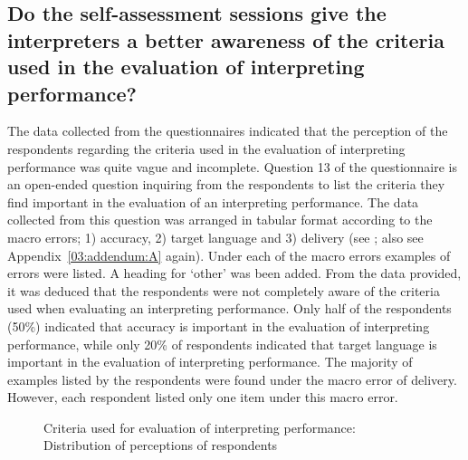 \documentclass[output=paper]{langsci/langscibook}
\begin{document}
\subsection{Do the self-assessment sessions give the interpreters a better awareness of the criteria used in the evaluation of interpreting performance?}
\largerpage
The data collected from the questionnaires indicated that the perception of the respondents regarding the criteria used in the evaluation of interpreting performance was quite vague and incomplete. Question 13 of the questionnaire is an open-ended question inquiring from the respondents to list the criteria they find important in the evaluation of an interpreting performance. The data collected from this question was arranged in tabular format according to the macro errors; 1) accuracy, 2) target language and 3) delivery (see ; also see Appendix~\ref{03:addendum:A} again). Under each of the macro errors examples of errors were listed. A heading for ‘other’ was been added. From the data provided, it was deduced that the respondents were not completely aware of the criteria used when evaluating an interpreting performance. Only half of the respondents (50\%) indicated that accuracy is important in the evaluation of interpreting performance, while only 20\% of respondents indicated that target language is important in the evaluation of interpreting performance. The majority of examples listed by the respondents were found under the macro error of delivery. However, each respondent listed only one item under this macro error. 

\begin{figure}
\caption{\label{fig:deysel:2}Criteria used for evaluation of interpreting performance: Distribution of perceptions of respondents}
\end{figure}
\end{document}
